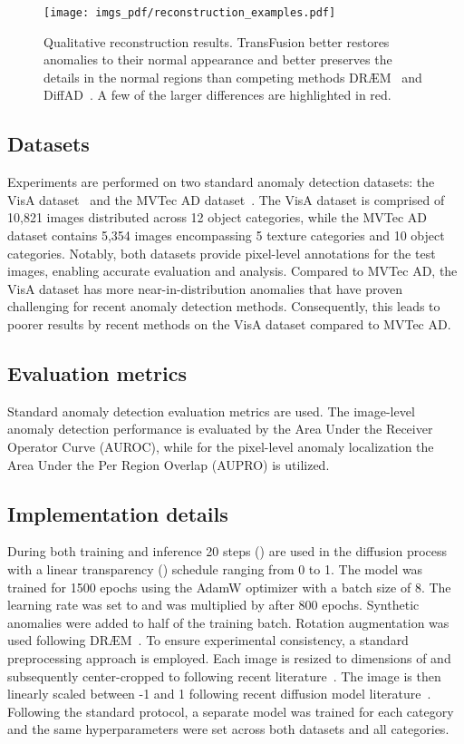 \documentclass[10pt,twocolumn,letterpaper]{article}
\begin{document}
\begin{figure}[h]
    \centering
    \texttt{[image: imgs\_pdf/reconstruction\_examples.pdf]}
    \caption{Qualitative reconstruction results. TransFusion better restores anomalies to their normal appearance and better preserves the details in the normal regions than competing methods DR{\AE}M~\cite{draem} and DiffAD~\cite{ldm_draem}. A few of the larger differences are highlighted in red.}
    \label{fig:recon-comp}
\end{figure}


\subsection{Datasets}

Experiments are performed on two standard anomaly detection datasets: the VisA dataset~\cite{visa} and the MVTec AD dataset~\cite{mvtec}. The VisA dataset is comprised of 10,821 images distributed across 12 object categories, while the MVTec AD dataset contains 5,354 images encompassing 5 texture categories and 10 object categories. Notably, both datasets provide pixel-level annotations for the test images, enabling accurate evaluation and analysis. Compared to MVTec AD, the VisA dataset has more near-in-distribution anomalies that have proven challenging for recent anomaly detection methods. Consequently, this leads to poorer results by recent methods on the VisA dataset compared to MVTec AD.


\subsection{Evaluation metrics}

Standard anomaly detection evaluation metrics are used. The image-level anomaly detection performance is evaluated by the Area Under the Receiver Operator Curve (AUROC), while for the pixel-level anomaly localization the Area Under the Per Region Overlap (AUPRO) is utilized. 


\subsection{Implementation details}
During both training and inference 20 steps () are used in the diffusion process with a linear transparency () schedule ranging from 0 to 1. 
The model was trained for 1500 epochs using the AdamW optimizer with a batch size of 8. The learning rate was set to  and was multiplied by  after 800 epochs. Synthetic anomalies were added to half of the training batch. Rotation augmentation was used following DR{\AE}M~\cite{draem}. To ensure experimental consistency, a standard preprocessing approach is employed. Each image is resized to dimensions of  and subsequently center-cropped to  following recent literature~\cite{patchcore, memseg, simplenet}. The image is then linearly scaled between -1 and 1 following recent diffusion model literature~\cite{ddpm,ddim}. Following the standard protocol, a separate model was trained for each category and the same hyperparameters were set across both datasets and all categories.
\end{document}
